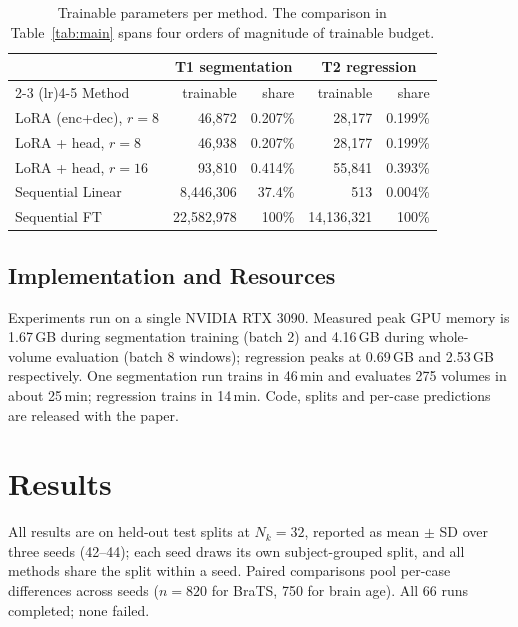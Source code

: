 \documentclass[journal,twoside,web]{ieeecolor}
\begin{document}
\begin{table}[t]
\caption{Trainable parameters per method. The comparison in Table~\ref{tab:main} spans four orders of magnitude of trainable budget.}
\label{tab:params}
\centering
\footnotesize
\setlength{\tabcolsep}{4pt}
\begin{tabular}{lrrrr}
\toprule
 & \multicolumn{2}{c}{T1 segmentation} & \multicolumn{2}{c}{T2 regression} \\
\cmidrule(lr){2-3} \cmidrule(lr){4-5}
Method & trainable & share & trainable & share \\
\midrule
LoRA (enc+dec), $r{=}8$   & 46,872     & 0.207\%  & 28,177     & 0.199\% \\
LoRA + head, $r{=}8$      & 46,938     & 0.207\%  & 28,177     & 0.199\% \\
LoRA + head, $r{=}16$     & 93,810     & 0.414\%  & 55,841     & 0.393\% \\
Sequential Linear         & 8,446,306  & 37.4\%   & 513        & 0.004\% \\
Sequential FT             & 22,582,978 & 100\%    & 14,136,321 & 100\% \\
\bottomrule
\end{tabular}
\end{table}

\subsection{Implementation and Resources}
\label{sec:impl}

Experiments run on a single NVIDIA RTX 3090. Measured peak GPU memory is 1.67\,GB during segmentation training (batch 2) and 4.16\,GB during whole-volume evaluation (batch 8 windows); regression peaks at 0.69\,GB and 2.53\,GB respectively. One segmentation run trains in 46\,min and evaluates 275 volumes in about 25\,min; regression trains in 14\,min. Code, splits and per-case predictions are released with the paper.

\section{Results}
\label{sec:results}

All results are on held-out test splits at $N_k=32$, reported as mean $\pm$ SD over three seeds (42--44); each seed draws its own subject-grouped split, and all methods share the split within a seed. Paired comparisons pool per-case differences across seeds ($n=820$ for BraTS, 750 for brain age). All 66 runs completed; none failed.
\end{document}

